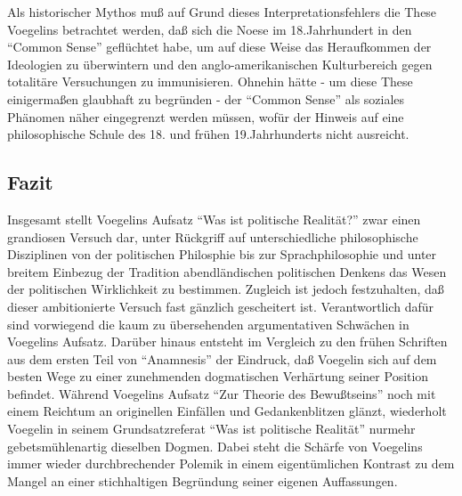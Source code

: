 
Als historischer Mythos muß auf Grund dieses Interpretationsfehlers die These
Voegelins betrachtet werden, daß sich die Noese im 18.Jahrhundert in den
"`Common Sense"' geflüchtet habe, um auf diese Weise das Heraufkommen der
Ideologien zu überwintern und den anglo-amerikanischen Kulturbereich gegen
totalitäre Versuchungen zu immunisieren. Ohnehin hätte - um diese These
einigermaßen glaubhaft zu begründen - der "`Common Sense"' als soziales
Phänomen näher eingegrenzt werden müssen, wofür der Hinweis auf eine
philosophische Schule des 18. und frühen 19.Jahrhunderts nicht ausreicht.

\subsection{Fazit}

Insgesamt stellt Voegelins Aufsatz "`Was ist politische Realität?"' zwar
einen grandiosen Versuch dar, unter Rückgriff auf unterschiedliche
philosophische Disziplinen von der politischen Philosphie bis zur
Sprachphilosophie und unter breitem Einbezug der Tradition
abendländischen politischen Denkens das Wesen der politischen
Wirklichkeit zu bestimmen. Zugleich ist jedoch festzuhalten, daß dieser
ambitionierte Versuch fast gänzlich gescheitert ist.  Verantwortlich
dafür sind vorwiegend die kaum zu übersehenden argumentativen Schwächen
in Voegelins Aufsatz. Darüber hinaus entsteht im Vergleich zu den frühen
Schriften aus dem ersten Teil von "`Anamnesis"' der Eindruck, daß
Voegelin sich auf dem besten Wege zu einer zunehmenden dogmatischen
Verhärtung seiner Position befindet. Während Voegelins Aufsatz "`Zur
Theorie des Bewußtseins"' noch mit einem Reichtum an originellen
Einfällen und Gedankenblitzen glänzt, wiederholt Voegelin in seinem
Grundsatzreferat "`Was ist politische Realität"' nurmehr
gebetsmühlenartig dieselben Dogmen. Dabei steht die Schärfe von
Voegelins immer wieder durchbrechender Polemik in einem eigentümlichen
Kontrast zu dem Mangel an einer stichhaltigen Begründung seiner eigenen
Auffassungen.


